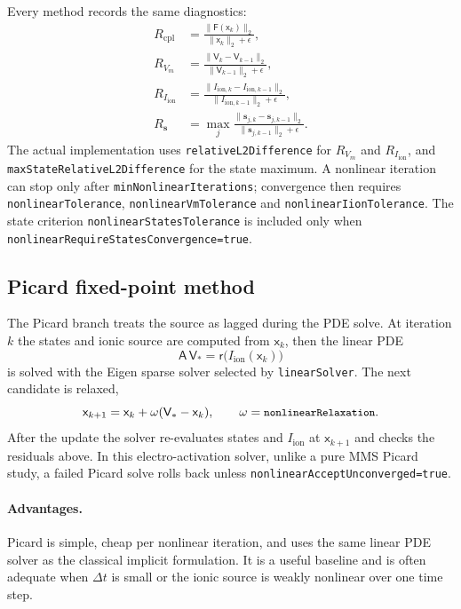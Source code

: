 \documentclass[11pt,a4paper]{article}
\newcommand{\Vm}{V_{m}}
\newcommand{\Iion}{I_{\text{ion}}}
\newcommand{\Aimp}{\mathsf{A}}
\newcommand{\code}[1]{\texttt{\small #1}}
\begin{document}
Every method records the same diagnostics:
\begin{align}
  R_{\mathrm{cpl}} &=
    \frac{\|\mathsf{F}(\mathsf{x}_{k})\|_2}
         {\|\mathsf{x}_{k}\|_2+\epsilon},\\
  R_{\Vm} &=
    \frac{\|\mathsf{V}_{k}-\mathsf{V}_{k-1}\|_2}
         {\|\mathsf{V}_{k-1}\|_2+\epsilon},\\
  R_{\Iion} &=
    \frac{\|I_{\mathrm{ion},k}-I_{\mathrm{ion},k-1}\|_2}
         {\|I_{\mathrm{ion},k-1}\|_2+\epsilon},\\
  R_{\mathbf{s}} &=
    \max_j
    \frac{\|\mathbf{s}_{j,k}-\mathbf{s}_{j,k-1}\|_2}
         {\|\mathbf{s}_{j,k-1}\|_2+\epsilon}.
\end{align}
The actual implementation uses \code{relativeL2Difference} for
$R_{\Vm}$ and $R_{\Iion}$, and \code{maxStateRelativeL2Difference} for
the state maximum. A nonlinear iteration can stop only after
\code{minNonlinearIterations}; convergence then requires
\code{nonlinearTolerance}, \code{nonlinearVmTolerance} and
\code{nonlinearIionTolerance}. The state criterion
\code{nonlinearStatesTolerance} is included only when
\code{nonlinearRequireStatesConvergence=true}.

\subsection{Picard fixed-point method}

The Picard branch treats the source as lagged during the PDE solve. At
iteration $k$ the states and ionic source are computed from
$\mathsf{x}_k$, then the linear PDE
\begin{equation}
  \Aimp\,\mathsf{V}_{*}
  =
  \mathsf{r}\!\bigl(\Iion(\mathsf{x}_{k})\bigr)
\end{equation}
is solved with the Eigen sparse solver selected by \code{linearSolver}.
The next candidate is relaxed,
\begin{equation}
  \mathsf{x}_{k+1}
  =
  \mathsf{x}_{k}
  + \omega(\mathsf{V}_{*}-\mathsf{x}_{k}),
  \qquad
  \omega=\code{nonlinearRelaxation}.
\end{equation}
After the update the solver re-evaluates states and $\Iion$ at
$\mathsf{x}_{k+1}$ and checks the residuals above. In this
electro-activation solver, unlike a pure MMS Picard study, a failed
Picard solve rolls back unless \code{nonlinearAcceptUnconverged=true}.

\paragraph{Advantages.}
Picard is simple, cheap per nonlinear iteration, and uses the same
linear PDE solver as the classical implicit formulation. It is a useful
baseline and is often adequate when $\Delta t$ is small or the ionic
source is weakly nonlinear over one time step.
\end{document}
